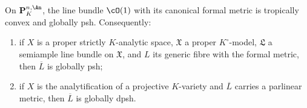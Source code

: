 \begin{theorem}
\label{thm:ch17-weil-globally-psh}
On $\mathbf P^{n,\An}_K$, the line bundle $\cO(1)$ with its canonical
formal metric is tropically convex and globally psh.  Consequently:
\begin{enumerate}
\item\label{itm:ch17-gpsh:semiample}
 if $X$ is a proper strictly $K$-analytic space, $\mathfrak X$ a
 proper $K^\circ$-model, $\mathfrak L$ a semiample line bundle on
 $\mathfrak X$, and $L$ its generic fibre with the formal metric, then
 $\overline L$ is globally psh;
\item\label{itm:ch17-gpsh:dpsh}
 if $X$ is the analytification of a projective $K$-variety and
 $\overline L$ carries a parlinear metric, then $\overline L$ is
 globally dpsh.
\end{enumerate}
\end{theorem}

